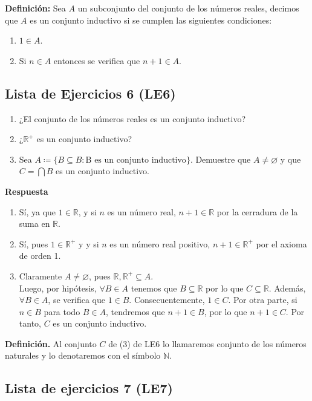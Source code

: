 \documentclass[11pt]{article}
\newcommand{\N}{\mathbb{N}}
\newcommand{\R}{\mathbb{R}}
\let\emptyset\varnothing
\begin{document}
\textbf{Definición:} Sea $A$ un subconjunto del conjunto de los números reales, decimos que $A$ es un conjunto inductivo si se cumplen las siguientes condiciones:
    \begin{enumerate}
        \item $1 \in A$.
        \item Si $n \in A$ entonces se verifica que $n+1 \in A$.
    \end{enumerate}

\subsection*{Lista de Ejercicios 6 (LE6)}

\begin{enumerate}[label=\arabic*)]
    \item ¿El conjunto de los números reales es un conjunto inductivo?
    \item ¿$\R^+$ es un conjunto inductivo?
    \item Sea $A\coloneqq \{B \subseteq B: \text{B es un conjunto inductivo}\}$. Demuestre que $A\neq \emptyset$ y que $C=\bigcap B$ es un conjunto inductivo.
\end{enumerate}

\pagebreak

\textbf{Respuesta}

\begin{enumerate}[label=\arabic*)]
    \item Sí, ya que $1 \in \R$, y si $n$ es un número real, $n+1 \in \R$ por la cerradura de la suma en $\R$.
    \item Sí, pues $1\in \R^+$ y y si $n$ es un número real positivo, $n+1 \in \R^+$ por el axioma de orden 1.
    \item Claramente $A \neq \emptyset$, pues $\R, \R^+ \subseteq A$. \\[5pt]Luego, por hipótesis, $\forall B \in A$ tenemos que $B\subseteq \R $ por lo que $C\subseteq \R$. Además, $\forall B\in A$, se verifica que $1\in B$. Consecuentemente, $1\in C$. Por otra parte, si $n\in B$ para todo $B\in A$, tendremos que $n+1\in B$, por lo que $n+1 \in C$. Por tanto, $C$ es un conjunto inductivo.
\end{enumerate}

\textbf{Definición.} Al conjunto $C$ de (3) de LE6 lo llamaremos conjunto de los números naturales y lo denotaremos con el símbolo $\N$.

\subsection*{Lista de ejercicios 7 (LE7)}
\end{document}
